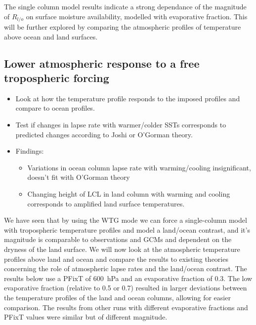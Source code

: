 The single column model results indicate a strong dependance of the magnitude of 
$R_{l/o}$ on surface moisture availability, modelled with evaporative fraction.  
This will be further explored by comparing the atmospheric profiles of 
temperature above ocean and land surfaces.


\subsection{Lower atmospheric response to a free tropospheric forcing}
\begin{itemize}
	\item Look at how the temperature profile responds to the imposed profiles 
		and compare to ocean profiles.
	\item Test if changes in lapse rate with warmer/colder SSTs corresponds to 
		predicted changes according to Joshi or O'Gorman theory.
	\item Findings:
		\begin{itemize}
			\item Variations in ocean column lapse rate with warming/cooling 
				insignificant, doesn't fit with O'Gorman theory
			\item Changing height of LCL in land column with warming and cooling 
				corresponds to amplified land surface temperatures.
		\end{itemize}
	\end{itemize}

We have seen that by using the WTG mode we can force a single-column model with 
tropospheric temperature profiles and model a land/ocean contrast, and it's 
magnitude is comparable to observations and GCMs and dependent on the dryness of 
the land surface.  We will now look at the atmospheric temperature profiles 
above land and ocean and compare the results to existing theories concerning the 
role of atmospheric lapse rates and the land/ocean contrast. The results below 
use a PFixT of \SI{600}{\hecto\pascal} and an evaporative fraction of 0.3. The 
low evaporative fraction (relative to 
0.5 or 0.7) resulted in larger deviations between the temperature profiles of 
the land and ocean columns, allowing for easier comparison. The results from 
other runs with different evaporative fractions and PFixT values were similar 
but of different magnitude.\\

